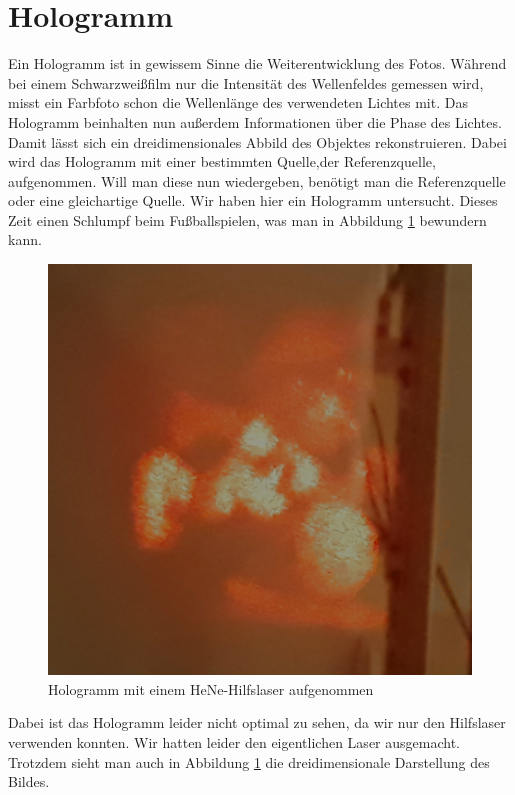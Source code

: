 \section{Hologramm}

Ein Hologramm ist in gewissem Sinne die Weiterentwicklung des Fotos. Während bei einem Schwarzweißfilm nur die Intensität 
des Wellenfeldes gemessen wird, misst ein Farbfoto schon die Wellenlänge des verwendeten Lichtes mit. Das Hologramm 
beinhalten nun außerdem Informationen über die Phase des Lichtes. Damit lässt sich ein dreidimensionales Abbild des 
Objektes rekonstruieren. Dabei wird das Hologramm mit einer bestimmten Quelle,der Referenzquelle, aufgenommen. Will man diese nun wiedergeben, benötigt man 
die Referenzquelle oder eine gleichartige Quelle. Wir haben hier ein Hologramm untersucht. Dieses Zeit einen Schlumpf 
beim Fußballspielen, was man in Abbildung \ref{bild:Holo} bewundern kann. 

\begin{figure}[ht]
    \centering
    \includegraphics[width = 12cm]{Bilder/Auswertung/Holo.png}
    \caption{Hologramm mit einem HeNe-Hilfslaser aufgenommen}
    \label{bild:Holo}
\end{figure}

Dabei ist das Hologramm leider nicht optimal zu sehen, da wir nur den Hilfslaser verwenden konnten. Wir hatten leider den eigentlichen Laser ausgemacht. Trotzdem sieht
man auch in Abbildung \ref{bild:Holo} die dreidimensionale Darstellung des Bildes.
